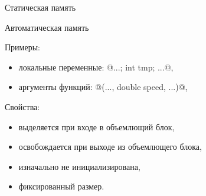 \begin{backup}
\begin{frame}[fragile]{Статическая память}
\end{frame}

\begin{frame}[fragile]{Автоматическая память}

  Примеры:
  \begin{itemize}
    \item локальные переменные: @{...; int tmp; ...}@,
    \item аргументы функций: @(..., double speed, ...)@,
  \end{itemize}

  \pause
  Свойства:
  \begin{itemize}
    \item выделяется при входе в объемлющий блок,
    \item освобождается при выходе из объемлющего блока,
    \item изначально не инициализирована,
    \item фиксированный размер.
  \end{itemize}

\end{frame}


\end{backup}




